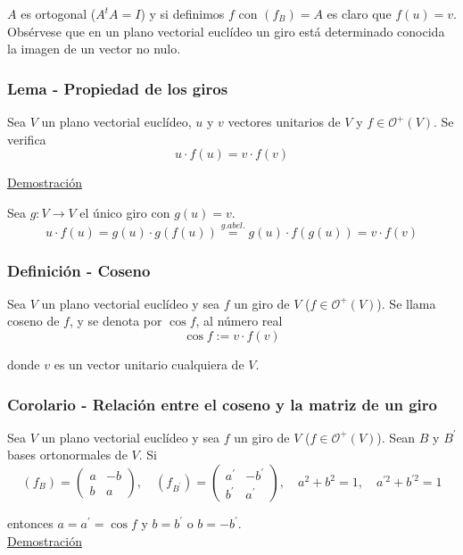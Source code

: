 \documentclass[12pt, a4paper, ones, notitlepage, openany,titlepage]{article}
\newcommand{\demostracion}{\noindent\underline{Demostración}}
\begin{document}
$A$ es ortogonal ($A^t A = I$) y si definimos $f$ con $(f_B) = A$ es claro que $f(u)=v$.\\

Obsérvese que en un plano vectorial euclídeo un giro está determinado conocida la imagen de un vector no nulo.

\subsubsection{Lema - Propiedad de los giros}
\noindent Sea $V$ un plano vectorial euclídeo, $u$ y $v$ vectores unitarios de $V$ y $f \in \mathcal{O}^{+}(V)$. Se verifica
$$
u \cdot f(u)=v \cdot f(v)
$$

\demostracion

\noindent Sea $g : V \longrightarrow V$ el único giro con $g(u) = v$.
$$
u \cdot f(u)=g(u) \cdot g(f(u)) \overset{g. abel.}{=} g(u) \cdot f(g(u))=v \cdot f(v)
$$

\subsubsection{Definición - Coseno}
Sea $V$ un plano vectorial euclídeo y sea $f$ un giro de $V$ ($f \in \mathcal{O}^+(V)$). Se llama coseno de $f$, y se denota por $\cos f$, al número real
$$
\cos f:=v \cdot f(v)
$$

\noindent donde $v$ es un vector unitario cualquiera de $V$.

\subsubsection{Corolario - Relación entre el coseno y la matriz de un giro}
Sea $V$ un plano vectorial euclídeo y sea $f$ un giro de $V$ ($f \in \mathcal{O}^+(V)$). Sean $B$ y $B^{\prime}$ bases ortonormales de $V$. Si
$$
(f_{B})=\left(\begin{array}{rr}
	a & -b \\
	b & a
\end{array}\right), \quad (f_{B^{\prime}})=\left(\begin{array}{rr}
	a^{\prime} & -b^{\prime} \\
	b^{\prime} & a^{\prime}
\end{array}\right), \quad a^{2}+b^{2}=1, \quad a^{\prime 2}+b^{\prime 2}=1
$$

\noindent entonces $a=a^{\prime}=\cos f$ y $b= b^{\prime}$ o $b= -b^{\prime}$.\\

\demostracion
\end{document}
